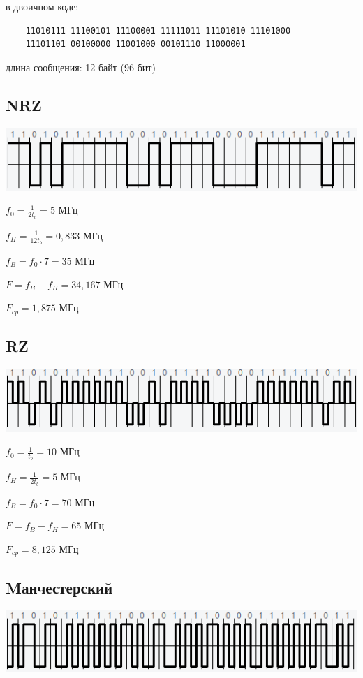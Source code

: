 в двоичном коде:

\begin{verbatim}
	11010111 11100101 11100001 11111011 11101010 11101000
	11101101 00100000 11001000 00101110 11000001
\end{verbatim}

длина сообщения: 12 байт (96 бит)
\subsection{NRZ}

\includegraphics[scale=0.7]{img/nrz_norm.png}

$f_0 = \frac{1}{2t_b} = 5$ МГц

$f_H = \frac{1}{12t_b} = 0,833$ МГц

$f_B = f_0 \cdot 7 = 35$ МГц

$F = f_B - f_H = 34,167$ МГц

$F_{cp} = 1,875$ МГц

\subsection{RZ}
\includegraphics[scale=0.7]{img/rz_norm.png}

$f_0 = \frac{1}{t_b} = 10$ МГц

$f_H = \frac{1}{2t_b} = 5$ МГц

$f_B = f_0 \cdot 7 = 70$ МГц

$F = f_B - f_H = 65$ МГц

$F_{cp} = 8,125$ МГц
\subsection{Mанчестерский}
\includegraphics[scale=0.7]{img/m_norm.png}

